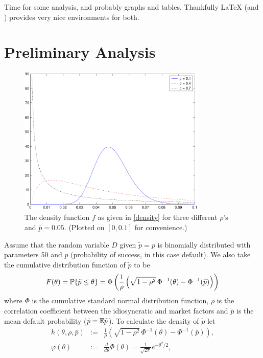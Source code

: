 
Time for some analysis, and probably graphs and tables. Thankfully
\LaTeX{} (and \LaTeXe{}) provides very nice environments for both.

\section{Preliminary Analysis}
\begin{figure}[t]
\begin{center}
\includegraphics[width=0.8\textwidth]{./Figures/dens.pdf}
\caption{The density function $f$ as given in \eqref{density} for
  three different $\rho$'s and $\bar{p} = 0.05$. (Plotted on $[0,
  0.1]$ for convenience.)}
\label{fig:dens}
\end{center}
\end{figure}
Assume that the random variable $D$ given $\tilde{p} = p$ is
binomially distributed with parameters 50 and $p$ (probability of
success, in this case default). We also take the cumulative
distribution function of $\tilde{p}$ to be
\begin{equation*}
F(\theta) = \P\{\tilde{p} \le \theta\} = \Phi \left( \frac{1}{\rho}
\left(\sqrt{1 - \rho^2}\, \Phi^{-1}(\theta) - \Phi^{-1}(\bar{p})
\right) \right)
\end{equation*}
where $\Phi$ is the cumulative standard normal distribution
function, $\rho$ is the correlation coefficient between the
idiosyncratic and market factors and $\bar{p}$ is the mean default
probability ($\bar{p} = \E \tilde{p}$). To calculate the density of
$\tilde{p}$ let
\begin{eqnarray*}
h(\theta, \rho, \bar{p}) &:=& \frac{1}{\rho} \left(\sqrt{1 -
\rho^2}\, \Phi^{-1}(\theta) - \Phi^{-1}(\bar{p}) \right), \\
\varphi(\theta) &:=& \frac{d}{d \theta} \Phi(\theta) =
\frac{1}{\sqrt{2 \pi}} e^{- \theta^2/2},
\end{eqnarray*}
